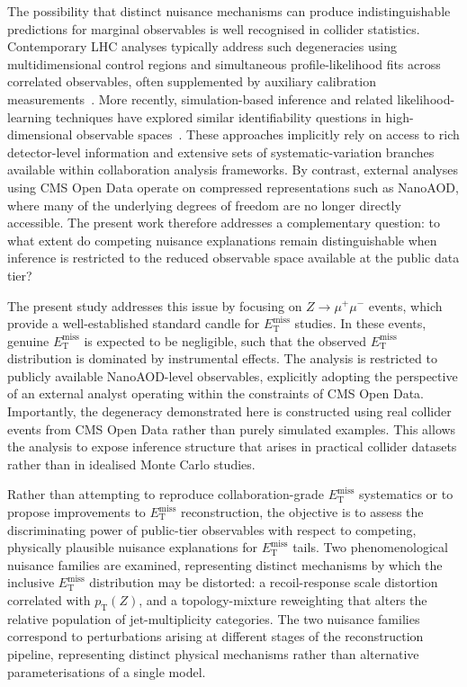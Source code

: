 \documentclass[a4paper,11pt]{article}
\newcommand{\MET}{\ensuremath{E_{\mathrm{T}}^{\mathrm{miss}}}\xspace}
\newcommand{\pTZ}{\ensuremath{p_{\mathrm{T}}(Z)}\xspace}
\newcommand{\zmumu}{\ensuremath{Z\!\to\!\mu^+\mu^-}\xspace}
\begin{document}
The possibility that distinct nuisance mechanisms can produce
indistinguishable predictions for marginal observables is well recognised in
collider statistics.
Contemporary LHC analyses typically address such degeneracies using
multidimensional control regions and simultaneous profile-likelihood fits
across correlated observables, often supplemented by auxiliary calibration
measurements~\cite{Cranmer:2014}.
More recently, simulation-based inference and related likelihood-learning
techniques have explored similar identifiability questions in
high-dimensional observable spaces~\cite{Valsecchi:2026,ATLAS:2024}.
These approaches implicitly rely on access to rich detector-level information
and extensive sets of systematic-variation branches available within
collaboration analysis frameworks.
By contrast, external analyses using CMS Open Data operate on compressed
representations such as NanoAOD, where many of the underlying degrees of
freedom are no longer directly accessible.
The present work therefore addresses a complementary question: to what extent
do competing nuisance explanations remain distinguishable when inference is
restricted to the reduced observable space available at the public data tier?

The present study addresses this issue by focusing on \zmumu events, which
provide a well-established standard candle for \MET studies.
In these events, genuine \MET is expected to be negligible, such that the
observed \MET distribution is dominated by instrumental effects.
The analysis is restricted to publicly available NanoAOD-level observables,
explicitly adopting the perspective of an external analyst operating within
the constraints of CMS Open Data.
Importantly, the degeneracy demonstrated here is constructed using real
collider events from CMS Open Data rather than purely simulated examples.
This allows the analysis to expose inference structure that arises in
practical collider datasets rather than in idealised Monte Carlo studies.

Rather than attempting to reproduce collaboration-grade \MET systematics or
to propose improvements to \MET reconstruction, the objective is to assess
the discriminating power of public-tier observables with respect to
competing, physically plausible nuisance explanations for \MET tails.
Two phenomenological nuisance families are examined, representing distinct
mechanisms by which the inclusive \MET distribution may be distorted: a
recoil-response scale distortion correlated with \pTZ, and a
topology-mixture reweighting that alters the relative population of
jet-multiplicity categories.
The two nuisance families correspond to perturbations arising at different
stages of the reconstruction pipeline, representing distinct physical
mechanisms rather than alternative parameterisations of a single model.
\end{document}
